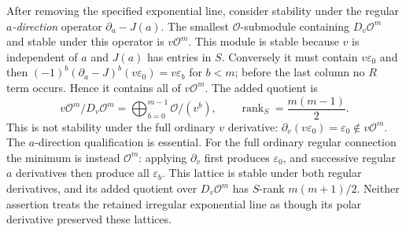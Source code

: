 \documentclass[11pt,a4paper]{article}
\theoremstyle{definition}
\begin{document}
After removing the specified exponential line, consider stability
under the regular \emph{$a$-direction} operator $\partial_a-J(a)$.
The smallest $\mathcal O$-submodule containing $D_v\mathcal O^m$ and
stable under this operator is $v\mathcal O^m$.  This module is stable
because $v$ is independent of $a$ and $J(a)$ has entries in $S$.
Conversely it must contain $v\varepsilon_0$ and then
$(-1)^b(\partial_a-J)^b(v\varepsilon_0)=v\varepsilon_b$ for $b<m$;
before the last column no $R$ term occurs.  Hence it contains all of
$v\mathcal O^m$.  The added quotient is
\begin{equation}
 v\mathcal O^m/D_v\mathcal O^m
       =\bigoplus_{b=0}^{m-1}\mathcal O/(v^b),
 \qquad \operatorname{rank}_S=\frac{m(m-1)}2.         \tag{IAL24}
\end{equation}
This is not stability under the full ordinary $v$ derivative:
$\partial_v(v\varepsilon_0)=\varepsilon_0\notin v\mathcal O^m$.
The $a$-direction qualification is essential.
For the full ordinary regular connection the minimum is instead
$\mathcal O^m$: applying $\partial_v$ first produces
$\varepsilon_0$, and successive regular $a$ derivatives then produce
all $\varepsilon_b$.  This lattice is stable under both regular
derivatives, and its added quotient over $D_v\mathcal O^m$ has
$S$-rank $m(m+1)/2$.  Neither assertion treats the retained irregular
exponential line as though its polar derivative preserved these lattices.
\end{document}
